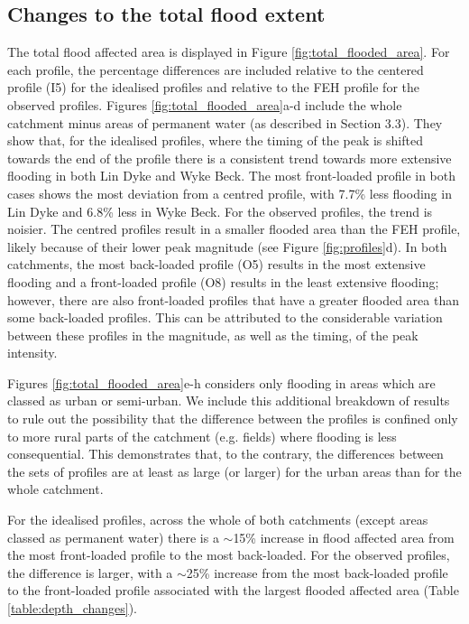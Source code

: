 \documentclass[APA,Times2COL]{WileyNJDv5}
\begin{document}
\subsection{Changes to the total flood extent}\label{subsec:model}

The total flood affected area is displayed in Figure \ref{fig:total_flooded_area}. For each profile, the percentage differences are included relative to the centered profile (I5) for the idealised profiles and relative to the FEH profile for the observed profiles. Figures \ref{fig:total_flooded_area}a-d include the whole catchment minus areas of permanent water (as described in Section 3.3). They show that, for the idealised profiles, where the timing of the peak is shifted towards the end of the profile there is a consistent trend towards more extensive flooding in both Lin Dyke and Wyke Beck. The most front-loaded profile in both cases shows the most deviation from a centred profile, with 7.7\% less flooding in Lin Dyke and 6.8\% less in Wyke Beck. For the observed profiles, the trend is noisier. The centred profiles result in a smaller flooded area than the FEH profile, likely because of their lower peak magnitude (see Figure \ref{fig:profiles}d). In both catchments, the most back-loaded profile (O5) results in the most extensive flooding and a front-loaded profile (O8) results in the least extensive flooding; however, there are also front-loaded profiles that have a greater flooded area than some back-loaded profiles. This can be attributed to the considerable variation between these profiles in the magnitude, as well as the timing, of the peak intensity. 

Figures \ref{fig:total_flooded_area}e-h considers only flooding in areas which are classed as urban or semi-urban. We include this additional breakdown of results to rule out the possibility that the difference between the profiles is confined only to more rural parts of the catchment (e.g. fields) where flooding is less consequential. This demonstrates that, to the contrary, the differences between the sets of profiles are at least as large (or larger) for the urban areas than for the whole catchment. 

For the idealised profiles, across the whole of both catchments (except areas classed as permanent water) there is a $\sim$15\% increase in flood affected area from the most front-loaded profile to the most back-loaded. For the observed profiles, the difference is larger, with a $\sim$25\% increase from the most back-loaded profile to the front-loaded profile associated with the largest flooded affected area (Table \ref{table:depth_changes}). 
\end{document}
